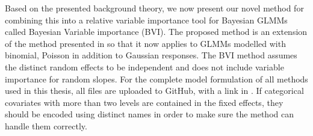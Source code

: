 Based on the presented background theory, we now present our novel method for combining this into a relative variable importance tool for Bayesian GLMMs called Bayesian Variable importance (BVI). The proposed method is an extension of the method presented in \citet{Arnstad:Relative_variable_importance_in_Bayesian_linear_mixed_models:2024} so that it now applies to GLMMs modelled with binomial, Poisson in addition to Gaussian responses. The BVI method assumes the distinct random effects to be independent and does not include variable importance for random slopes.
\newline
\newline
For the complete model formulation of all methods used in this thesis, all files are uploaded to GitHub, with a link in . 
If categorical covariates with more than two levels are contained in the fixed effects, they should be encoded using distinct names in order to make sure the method can handle them correctly.
